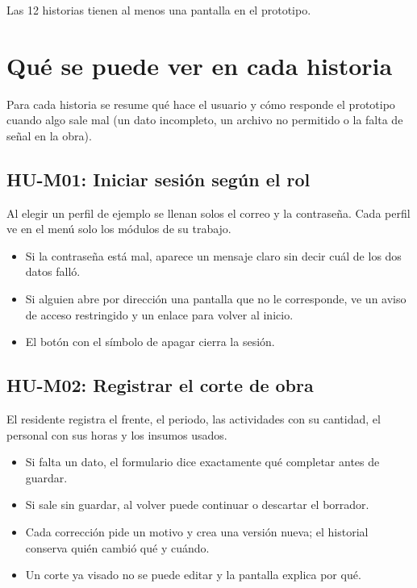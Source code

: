 \documentclass[11pt]{article}
\begin{document}
Las 12 historias tienen al menos una pantalla en el prototipo.

\section{Qué se puede ver en cada historia}

Para cada historia se resume qué hace el usuario y cómo responde el prototipo cuando algo sale mal (un dato incompleto, un archivo no permitido o la falta de señal en la obra).

\subsection*{HU-M01: Iniciar sesión según el rol}
Al elegir un perfil de ejemplo se llenan solos el correo y la contraseña. Cada perfil ve en el menú solo los módulos de su trabajo.
\begin{itemize}
  \item Si la contraseña está mal, aparece un mensaje claro sin decir cuál de los dos datos falló.
  \item Si alguien abre por dirección una pantalla que no le corresponde, ve un aviso de acceso restringido y un enlace para volver al inicio.
  \item El botón con el símbolo de apagar cierra la sesión.
\end{itemize}

\subsection*{HU-M02: Registrar el corte de obra}
El residente registra el frente, el periodo, las actividades con su cantidad, el personal con sus horas y los insumos usados.
\begin{itemize}
  \item Si falta un dato, el formulario dice exactamente qué completar antes de guardar.
  \item Si sale sin guardar, al volver puede continuar o descartar el borrador.
  \item Cada corrección pide un motivo y crea una versión nueva; el historial conserva quién cambió qué y cuándo.
  \item Un corte ya visado no se puede editar y la pantalla explica por qué.
\end{itemize}
\end{document}
